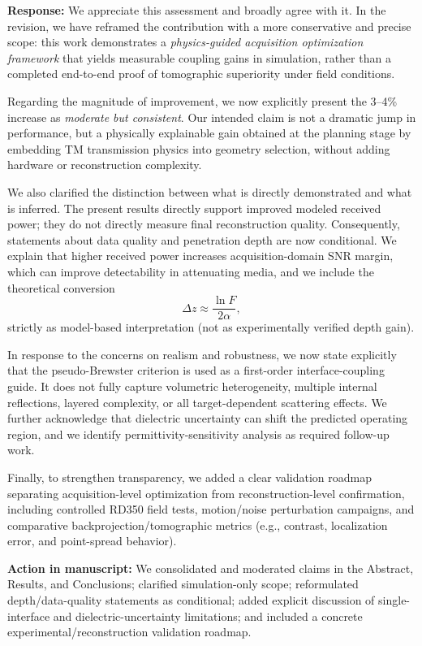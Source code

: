 \documentclass[11pt]{article}
\begin{document}
\textbf{Response:} We appreciate this assessment and broadly agree with it. In the revision, we have reframed the contribution with a more conservative and precise scope: this work demonstrates a \emph{physics-guided acquisition optimization framework} that yields measurable coupling gains in simulation, rather than a completed end-to-end proof of tomographic superiority under field conditions.

Regarding the magnitude of improvement, we now explicitly present the 3--4\% increase as \emph{moderate but consistent}. Our intended claim is not a dramatic jump in performance, but a physically explainable gain obtained at the planning stage by embedding TM transmission physics into geometry selection, without adding hardware or reconstruction complexity.

We also clarified the distinction between what is directly demonstrated and what is inferred. The present results directly support improved modeled received power; they do not directly measure final reconstruction quality. Consequently, statements about data quality and penetration depth are now conditional. We explain that higher received power increases acquisition-domain SNR margin, which can improve detectability in attenuating media, and we include the theoretical conversion
\begin{equation}
\Delta z \approx \frac{\ln F}{2\alpha},
\end{equation}
strictly as model-based interpretation (not as experimentally verified depth gain).

In response to the concerns on realism and robustness, we now state explicitly that the pseudo-Brewster criterion is used as a first-order interface-coupling guide. It does not fully capture volumetric heterogeneity, multiple internal reflections, layered complexity, or all target-dependent scattering effects. We further acknowledge that dielectric uncertainty can shift the predicted operating region, and we identify permittivity-sensitivity analysis as required follow-up work.

Finally, to strengthen transparency, we added a clear validation roadmap separating acquisition-level optimization from reconstruction-level confirmation, including controlled RD350 field tests, motion/noise perturbation campaigns, and comparative backprojection/tomographic metrics (e.g., contrast, localization error, and point-spread behavior).

\textbf{Action in manuscript:} We consolidated and moderated claims in the Abstract, Results, and Conclusions; clarified simulation-only scope; reformulated depth/data-quality statements as conditional; added explicit discussion of single-interface and dielectric-uncertainty limitations; and included a concrete experimental/reconstruction validation roadmap.
\end{document}
